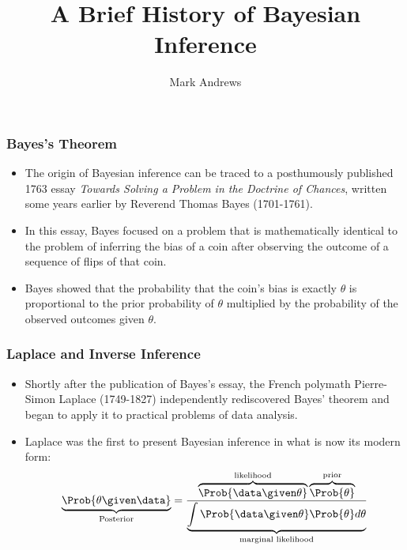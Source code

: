 \documentclass{slides}
\title{A Brief History of Bayesian Inference}
\author[Andrews]{Mark Andrews}
\date{}
\begin{document}
{
	\begin{frame}
		\titlepage
	\end{frame}
}


\begin{frame}
	\frametitle{Bayes's Theorem}
	\begin{itemize}

	\item  The origin of Bayesian inference can be traced to a posthumously published 1763 essay
		\emph{Towards Solving a Problem in the Doctrine of Chances},
		written some years earlier by Reverend Thomas Bayes
		(1701-1761). 

	\item In this essay, Bayes focused on a problem that is mathematically
		identical to the problem of inferring the bias of a coin after
		observing the outcome of a sequence of flips of that coin.  
		
	\item Bayes showed that the probability that the coin's bias is exactly
		$\theta$ is proportional to the prior probability of $\theta$
		multiplied by the probability of the observed outcomes given
		$\theta$.
\end{itemize}
\end{frame}

\begin{frame}
	\frametitle{Laplace and Inverse Inference}
	\begin{itemize}
		\item Shortly after the publication of Bayes's essay,  the
			French polymath Pierre-Simon Laplace (1749-1827)
			independently rediscovered Bayes' theorem and began to
			apply it to practical problems of data analysis.


	\item Laplace was the first to present Bayesian inference in what is now its modern form:
		\[
			\underbrace{\Prob{\theta \given \data}}_{\text{Posterior}}
			= 
			\frac{\overbrace{\Prob{\data \given \theta}}^{\text{likelihood}}
				\overbrace{\Prob{\theta}}^{\text{prior}}}
				{\underbrace{\int \Prob{\data \given \theta}\Prob{\theta} d\theta}_{\text{marginal likelihood}}}
		\]

\end{itemize}
\end{frame}
\end{document}
